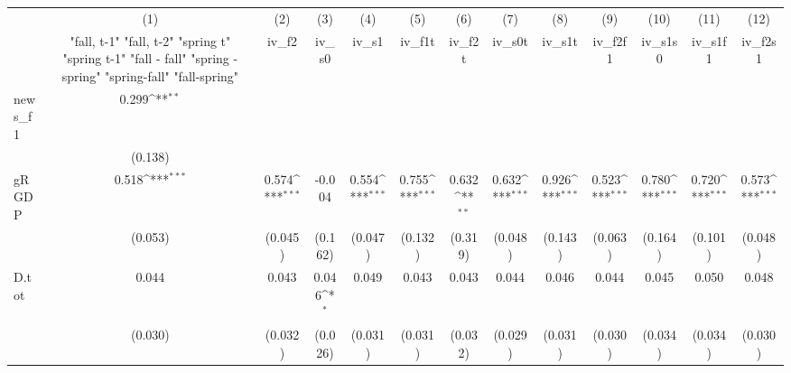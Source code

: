{
\def\sym#1{\ifmmode^{#1}\else\(^{#1}\)\fi}
\begin{tabular}{l*{12}{c}}
\toprule
            &\multicolumn{1}{c}{(1)}&\multicolumn{1}{c}{(2)}&\multicolumn{1}{c}{(3)}&\multicolumn{1}{c}{(4)}&\multicolumn{1}{c}{(5)}&\multicolumn{1}{c}{(6)}&\multicolumn{1}{c}{(7)}&\multicolumn{1}{c}{(8)}&\multicolumn{1}{c}{(9)}&\multicolumn{1}{c}{(10)}&\multicolumn{1}{c}{(11)}&\multicolumn{1}{c}{(12)}\\
            &\multicolumn{1}{c}{  "fall, t-1" "fall, t-2" "spring t" "spring t-1"  "fall - fall" "spring - spring" "spring-fall" "fall-spring" }&\multicolumn{1}{c}{iv\_f2}&\multicolumn{1}{c}{iv\_s0}&\multicolumn{1}{c}{iv\_s1}&\multicolumn{1}{c}{iv\_f1t}&\multicolumn{1}{c}{iv\_f2t}&\multicolumn{1}{c}{iv\_s0t}&\multicolumn{1}{c}{iv\_s1t}&\multicolumn{1}{c}{iv\_f2f1}&\multicolumn{1}{c}{iv\_s1s0}&\multicolumn{1}{c}{iv\_s1f1}&\multicolumn{1}{c}{iv\_f2s1}\\
\midrule
news\_f1     &       0.299\sym{**} &                     &                     &                     &                     &                     &                     &                     &                     &                     &                     &                     \\
            &     (0.138)         &                     &                     &                     &                     &                     &                     &                     &                     &                     &                     &                     \\
\addlinespace
gRGDP       &       0.518\sym{***}&       0.574\sym{***}&      -0.004         &       0.554\sym{***}&       0.755\sym{***}&       0.632\sym{**} &       0.632\sym{***}&       0.926\sym{***}&       0.523\sym{***}&       0.780\sym{***}&       0.720\sym{***}&       0.573\sym{***}\\
            &     (0.053)         &     (0.045)         &     (0.162)         &     (0.047)         &     (0.132)         &     (0.319)         &     (0.048)         &     (0.143)         &     (0.063)         &     (0.164)         &     (0.101)         &     (0.048)         \\
\addlinespace
D.tot       &       0.044         &       0.043         &       0.046\sym{*}  &       0.049         &       0.043         &       0.043         &       0.044         &       0.046         &       0.044         &       0.045         &       0.050         &       0.048         \\
            &     (0.030)         &     (0.032)         &     (0.026)         &     (0.031)         &     (0.031)         &     (0.032)         &     (0.029)         &     (0.031)         &     (0.030)         &     (0.034)         &     (0.034)         &     (0.030)         \\

\end{tabular}}
